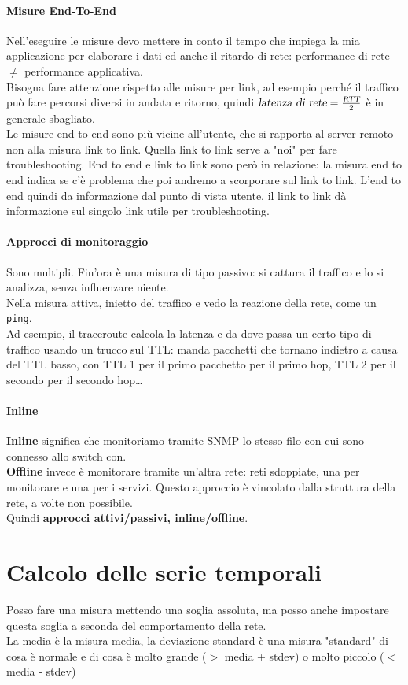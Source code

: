 \documentclass[10pt]{book}
\begin{document}
\paragraph{Misure End-To-End} Nell'eseguire le misure devo mettere in conto il tempo che impiega la mia applicazione per elaborare i dati ed anche il ritardo di rete: performance di rete $\neq$ performance applicativa.\\
Bisogna fare attenzione rispetto alle misure per link, ad esempio perché il traffico può fare percorsi diversi in andata e ritorno, quindi $\textsl{latenza di rete} = \frac{\textsl{RTT}}{2}$ è in generale sbagliato.\\
Le misure end to end sono più vicine all'utente, che si rapporta al server remoto non alla misura link to link. Quella link to link serve a "noi" per fare troubleshooting. End to end e link to link sono però in relazione: la misura end to end indica se c'è problema che poi andremo a scorporare sul link to link. L'end to end quindi da informazione dal punto di vista utente, il link to link dà informazione sul singolo link utile per troubleshooting.
\paragraph{Approcci di monitoraggio} Sono multipli. Fin'ora è una misura di tipo passivo: si cattura il traffico e lo si analizza, senza influenzare niente.\\
Nella misura attiva, inietto del traffico e vedo la reazione della rete, come un \texttt{ping}.\\
Ad esempio, il traceroute calcola la latenza e da dove passa un certo tipo di traffico usando un trucco sul TTL: manda pacchetti che tornano indietro a causa del TTL basso, con TTL 1 per il primo pacchetto per il primo hop, TTL 2 per il secondo per il secondo hop\ldots
\paragraph{Inline} \textbf{Inline} significa che monitoriamo tramite SNMP lo stesso filo con cui sono connesso allo switch con.\\
\textbf{Offline} invece è monitorare tramite un'altra rete: reti sdoppiate, una per monitorare e una per i servizi. Questo approccio è vincolato dalla struttura della rete, a volte non possibile.\\
Quindi \textbf{approcci attivi/passivi, inline/offline}.
\section{Calcolo delle serie temporali}
Posso fare una misura mettendo una soglia assoluta, ma posso anche impostare questa soglia a seconda del comportamento della rete.\\
La media è la misura media, la deviazione standard è una misura "standard" di cosa è normale e di cosa è molto grande ($>$ media + stdev) o molto piccolo ($<$ media - stdev)
\end{document}
